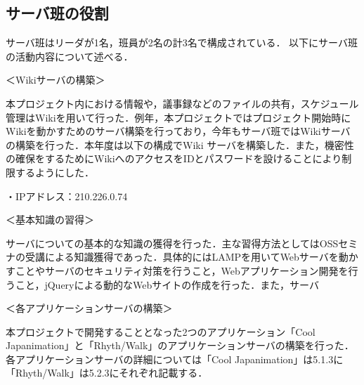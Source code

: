 \subsection{サーバ班の役割}
\par サーバ班はリーダが1名，班員が2名の計3名で構成されている．
以下にサーバ班の活動内容について述べる．
\par ＜Wikiサーバの構築＞
\par
本プロジェクト内における情報や，議事録などのファイルの共有，スケジュール管理はWikiを用いて行った．例年，本プロジェクトではプロジェクト開始時にWikiを動かすためのサーバ構築を行っており，今年もサーバ班ではWikiサーバの構築を行った．本年度は以下の構成でWiki サーバを構築した．また，機密性の確保をするためにWikiへのアクセスをIDとパスワードを設けることにより制限するようにした．
\par ・IPアドレス：210.226.0.74
\par
\par
\par ＜基本知識の習得＞
\par
サーバについての基本的な知識の獲得を行った．主な習得方法としてはOSSセミナの受講による知識獲得であった．具体的にはLAMPを用いてWebサーバを動かすことやサーバのセキュリティ対策を行うこと，Webアプリケーション開発を行うこと，jQueryによる動的なWebサイトの作成を行った．また，サーバ
\par ＜各アプリケーションサーバの構築＞
\par
本プロジェクトで開発することとなった2つのアプリケーション「Cool Japanimation」と「Rhyth/Walk」のアプリケーションサーバの構築を行った．各アプリケーションサーバの詳細については「Cool Japanimation」は5.1.3に「Rhyth/Walk」は5.2.3にそれぞれ記載する．

